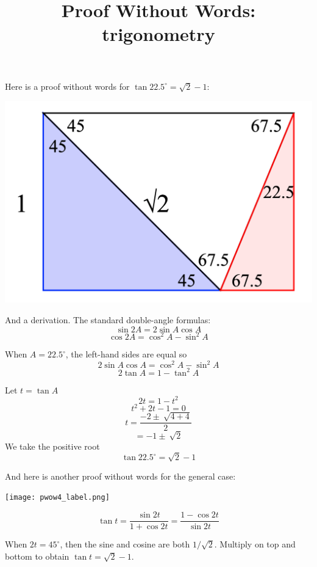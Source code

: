 \documentclass[11pt, oneside]{article}
\title{Proof Without Words:  trigonometry}
\date{}
\begin{document}
\maketitle
\Large


Here is a proof without words for $\tan 22.5^\circ = \sqrt{2} - 1$:
\begin{center} \includegraphics [scale=0.3] {pwow1_label.png} \end{center}

And a derivation.  The standard double-angle formulas:
\[ \sin 2A = 2 \sin A \cos A \]
\[ \cos 2A = \cos^2 A - \sin^2 A \]

When $A = 22.5^\circ$, the left-hand sides are equal so
\[ 2 \sin A \cos A = \cos^2 A - \sin^2 A \]
\[ 2 \tan A = 1 - \tan^2 A \]

Let $t = \tan A$
\[ 2t = 1 - t^2 \]
\[ t^2 + 2t - 1 = 0 \]
\[ t = \frac{-2 \pm \ \sqrt{4 + 4}}{2} \]
\[ = -1 \pm \ \sqrt{2} \]
We take the positive root
\[ \tan 22.5^\circ = \sqrt{2} - 1 \]

And here is another proof without words for the general case:

\begin{center} \texttt{[image: pwow4\_label.png]} \end{center}
\[ \tan t = \frac{\sin 2t}{1 + \cos 2t} = \frac{1 - \cos 2t}{\sin 2t} \]

When $2t = 45^\circ$, then the sine and cosine are both $1/\sqrt{2}$.  Multiply on top and bottom to obtain $\tan t = \sqrt{2} - 1$.
\end{document}
